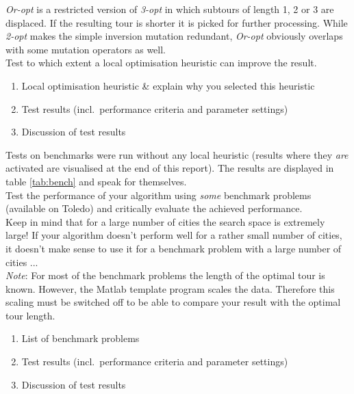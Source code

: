 \par\noindent \textit{Or-opt} is a restricted version of \textit{3-opt} in which subtours of length 1, 2 or 3 are displaced. If the resulting tour is shorter it is picked for further processing. While \textit{2-opt} makes the simple inversion mutation redundant, \textit{Or-opt} obviously overlaps with some mutation operators as well.\\

Test to which extent a local optimisation heuristic can improve the result.
\begin{enumerate}
\item	Local optimisation heuristic \& explain why you selected this heuristic
\item Test results (incl.\ performance criteria and parameter settings)
\item Discussion of test results

\end{enumerate}


Tests on benchmarks were run without any local heuristic (results where they \textit{are} activated are visualised at the end of this report). The results are displayed in table \ref{tab:bench} and speak for themselves.\\

Test the performance of your algorithm using \emph{some} benchmark problems (available on Toledo) and critically evaluate the achieved performance.\\
{\small
Keep in mind that for a large number of cities the search space is extremely large! If your algorithm doesn't perform well for a rather small number of cities, it doesn't make sense to use it for a benchmark problem with a  large number of cities ...\\
\emph{Note}: For most of the benchmark problems the length of the optimal tour is known. However, the Matlab template program scales the data. Therefore this scaling must be switched off to be able to compare your result with the optimal tour length.
}
\begin{enumerate}
\item	 List of benchmark problems
\item Test results (incl.\ performance criteria and parameter settings)
\item Discussion of test results

\end{enumerate}

